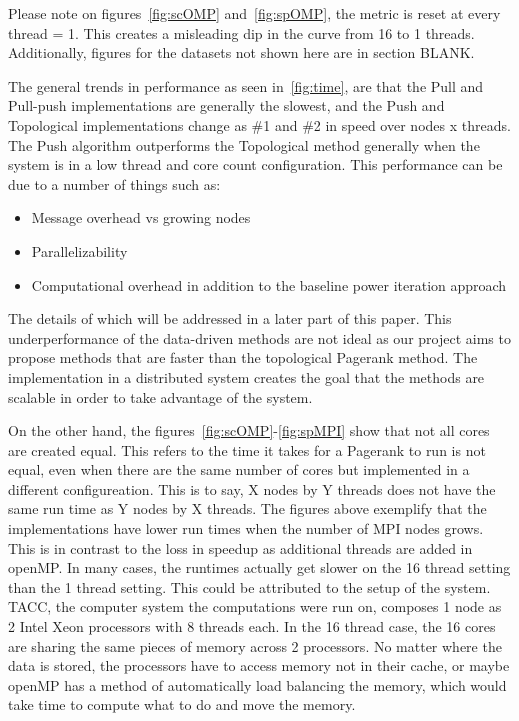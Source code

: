 \documentclass[letterpaper,11pt,onecolumn]{article}
\begin{document}
Please note on figures~\ref{fig:scOMP} and~\ref{fig:spOMP}, the metric is reset at every thread = 1. This creates a misleading dip in the curve from 16 to 1 threads. Additionally, figures for the datasets not shown here are in section BLANK.

The general trends in performance as seen in~\ref{fig:time}, are that the Pull and Pull-push implementations are generally the slowest, and the Push and Topological implementations change as \#1 and \#2 in speed over nodes x threads. The Push algorithm outperforms the Topological method generally when the system is in a low thread and core count configuration. This performance can be due to a number of things such as:

\begin{itemize}
  \item Message overhead vs growing nodes
  \item Parallelizability
  \item Computational overhead in addition to the baseline power iteration approach
\end{itemize}

The details of which will be addressed in a later part of this paper. This underperformance of the data-driven methods are not ideal as our project aims to propose methods that are faster than the topological Pagerank method. The implementation in a distributed system creates the goal that the methods are scalable in order to take advantage of the system. 

On the other hand, the figures~\ref{fig:scOMP}-\ref{fig:spMPI} show that not all cores are created equal. This refers to the time it takes for a Pagerank to run is not equal, even when there are the same number of cores but implemented in a different configureation. This is to say, X nodes by Y threads does not have the same run time as Y nodes by X threads. The figures above exemplify that the implementations have lower run times when the number of MPI nodes grows. This is in contrast to the loss in speedup as additional threads are added in openMP. In many cases, the runtimes actually get slower on the 16 thread setting than the 1 thread setting. This could be attributed to the setup of the system. TACC, the computer system the computations were run on, composes 1 node as 2 Intel Xeon processors with 8 threads each. In the 16 thread case, the 16 cores are sharing the same pieces of memory across 2 processors. No matter where the data is stored, the processors have to access memory not in their cache, or maybe openMP has a method of automatically load balancing the memory, which would take time to compute what to do and move the memory. 
\end{document}
